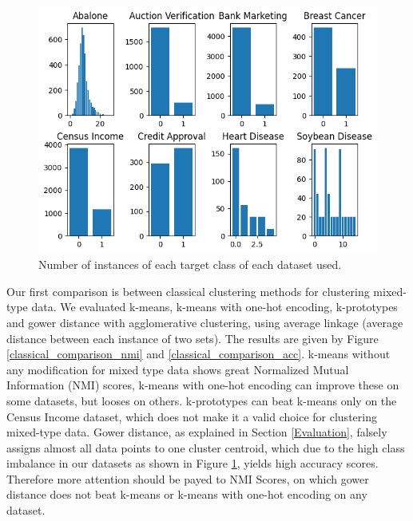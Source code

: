 \begin{figure}
\centering
	\includegraphics[width=0.8\linewidth]{class-imbalance.png}
	\caption{Number of instances of each target class of each dataset used.}
	\label{class_imbalance}
\end{figure}

Our first comparison is between classical clustering methods for clustering mixed-type data. We evaluated k-means, k-means with one-hot encoding, k-prototypes and gower distance with agglomerative clustering, using average linkage (average distance between each instance of two sets). The results are given by Figure \ref{classical_comparison_nmi} and \ref{classical_comparison_acc}. k-means without any modification for mixed type data shows great Normalized Mutual Information (NMI) scores, k-means with one-hot encoding can improve these on some datasets, but looses on others. k-prototypes can beat k-means only on the Census Income dataset, which does not make it a valid choice for clustering mixed-type data. Gower distance, as explained in Section \ref{Evaluation}, falsely assigns almost all data points to one cluster centroid, which due to the high class imbalance in our datasets as shown in Figure \ref{class_imbalance}, yields high accuracy scores. Therefore more attention should be payed to NMI Scores, on which gower distance does not beat k-means or k-means with one-hot encoding on any dataset. 

